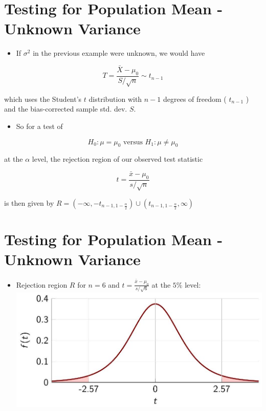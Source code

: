 \documentclass[10pt]{article}
\begin{document}
\section*{Testing for Population Mean - Unknown Variance}
\begin{itemize}
  \item If $\sigma^{2}$ in the previous example were unknown, we would have
\end{itemize}

$$
T=\frac{\bar{X}-\mu_{0}}{S / \sqrt{n}} \sim t_{n-1}
$$

which uses the Student's $t$ distribution with $n-1$ degrees of freedom ( $t_{n-1}$ ) and the bias-corrected sample std. dev. $S$.

\begin{itemize}
  \item So for a test of
\end{itemize}

$$
H_{0}: \mu=\mu_{0} \text { versus } H_{1}: \mu \neq \mu_{0}
$$

at the $\alpha$ level, the rejection region of our observed test statistic

$$
t=\frac{\bar{x}-\mu_{0}}{s / \sqrt{n}}
$$

is then given by $R=\left(-\infty,-t_{n-1,1-\frac{\alpha}{2}}\right) \cup\left(t_{n-1,1-\frac{\alpha}{2}}, \infty\right)$

\section*{Testing for Population Mean - Unknown Variance}
\begin{itemize}
  \item Rejection region $R$ for $n=6$ and $t=\frac{\bar{x}-\mu_{0}}{s / \sqrt{6}}$ at the $5 \%$ level:\\
\includegraphics[max width=\textwidth, center]{2025_05_12_2c033a5f0417cd8b136fg-48}
\end{itemize}
\end{document}
